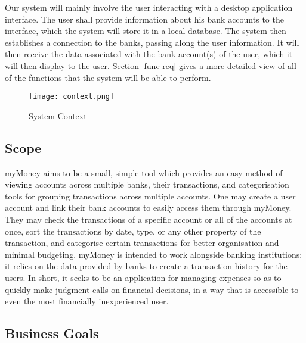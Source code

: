 \documentclass[11pt]{article}
\newcounter{use case ID}
\newcounter{req ID}
\begin{document}
Our system will mainly involve the user interacting with a desktop application interface. The user shall provide information about his bank accounts to the interface, which the system will store it in a local database. The system then establishes a connection to the banks, passing along the user information. It will then receive the data associated with the bank account(s) of the user, which it will then display to the user. Section \ref{func req} gives a more detailed view of all of the functions that the system will be able to perform.

\clearpage

\begin{figure}[htbp]
\texttt{[image: context.png]}
\caption{System Context}
\label{fig:system-context}
\end{figure}

\subsection{Scope}
myMoney aims to be a small, simple tool which provides an easy method of viewing accounts across multiple banks, their transactions, and categorisation tools for grouping transactions across multiple accounts. One may create a user account and link their bank accounts to easily access them through myMoney. They may check the transactions of a specific account or all of the accounts at once, sort the transactions by date, type, or any other property of the transaction, and categorise certain transactions for better organisation and minimal budgeting. myMoney is intended to work alongside banking institutions: it relies on the data provided by banks to create a transaction history for the users. In short, it seeks to be an application for managing expenses so as to quickly make judgment calls on financial decisions, in a way that is accessible to even the most financially inexperienced user.

\clearpage

\subsection{Business Goals}
\end{document}
